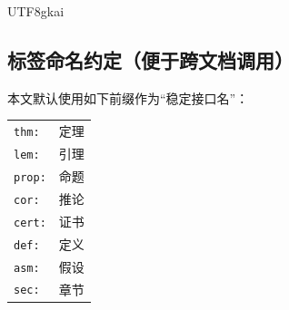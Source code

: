 \documentclass[12pt]{article}
\begin{document}
\begin{CJK*}{UTF8}{gkai}
\subsection{标签命名约定（便于跨文档调用）}
本文默认使用如下前缀作为“稳定接口名”：
\begin{center}
\renewcommand{\arraystretch}{1.05}
\begin{tabular}{>{\raggedright\arraybackslash}p{} >{\raggedright\arraybackslash}p{}}
  \texttt{thm:}  & 定理 \\
  \texttt{lem:}  & 引理 \\
  \texttt{prop:} & 命题 \\
  \texttt{cor:}  & 推论 \\
  \texttt{cert:} & 证书 \\
  \texttt{def:}  & 定义 \\
  \texttt{asm:}  & 假设 \\
  \texttt{sec:}  & 章节 \\
\end{tabular}
\end{center}


\end{CJK*}
\end{document}
